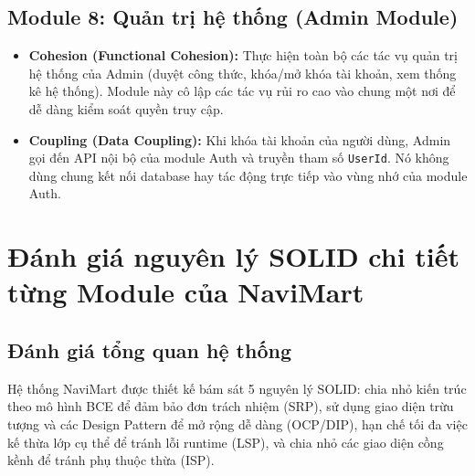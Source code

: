 \documentclass[12pt,a4paper]{article}
\begin{document}
\subsection{Module 8: Quản trị hệ thống (Admin Module)}
\begin{itemize}
    \item \textbf{Cohesion (Functional Cohesion):} Thực hiện toàn bộ các tác vụ quản trị hệ thống của Admin (duyệt công thức, khóa/mở khóa tài khoản, xem thống kê hệ thống). Module này cô lập các tác vụ rủi ro cao vào chung một nơi để dễ dàng kiểm soát quyền truy cập.
    \item \textbf{Coupling (Data Coupling):} Khi khóa tài khoản của người dùng, Admin gọi đến API nội bộ của module Auth và truyền tham số \texttt{UserId}. Nó không dùng chung kết nối database hay tác động trực tiếp vào vùng nhớ của module Auth.
\end{itemize}

\section{Đánh giá nguyên lý SOLID chi tiết từng Module của NaviMart}

\subsection{Đánh giá tổng quan hệ thống}
Hệ thống NaviMart được thiết kế bám sát 5 nguyên lý SOLID: chia nhỏ kiến trúc theo mô hình BCE để đảm bảo đơn trách nhiệm (SRP), sử dụng giao diện trừu tượng và các Design Pattern để mở rộng dễ dàng (OCP/DIP), hạn chế tối đa việc kế thừa lớp cụ thể để tránh lỗi runtime (LSP), và chia nhỏ các giao diện cồng kềnh để tránh phụ thuộc thừa (ISP).
\end{document}
